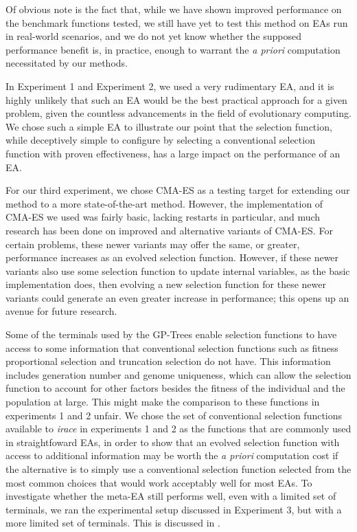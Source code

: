 \documentclass[sigconf]{acmart}
\begin{document}
Of obvious note is the fact that, while we have shown improved performance on the benchmark functions tested, we still have yet to test this method on EAs run in real-world scenarios, and we do not yet know whether the supposed performance benefit is, in practice, enough to warrant the \textit{a priori} computation necessitated by our methods.

In Experiment 1 and Experiment 2, we used a very rudimentary EA, and it is highly unlikely that such an EA would be the best practical approach for a given problem, given the countless advancements in the field of evolutionary computing. We chose such a simple EA to illustrate our point that the selection function, while deceptively simple to configure by selecting a conventional selection function with proven effectiveness, has a large impact on the performance of an EA.

For our third experiment, we chose CMA-ES as a testing target for extending our method to a more state-of-the-art method. However, the implementation of CMA-ES we used was fairly basic, lacking restarts in particular, and much research has been done on improved and alternative variants of CMA-ES. For certain problems, these newer variants may offer the same, or greater, performance increases as an evolved selection function. However, if these newer variants also use some selection function to update internal variables, as the basic implementation does, then evolving a new selection function for these newer variants could generate an even greater increase in performance; this opens up an avenue for future research.

Some of the terminals used by the GP-Trees enable selection functions to have access to some information that conventional selection functions such as fitness proportional selection and truncation selection do not have. This information includes generation number and genome uniqueness, which can allow the selection function to account for other factors besides the fitness of the individual and the population at large. This might make the comparison to these functions in experiments 1 and 2 unfair. We chose the set of conventional selection functions available to \textit{irace} in experiments 1 and 2 as the functions that are commonly used in straightfoward EAs, in order to show that an evolved selection function with access to additional information may be worth the \textit{a priori} computation cost if the alternative is to simply use a conventional selection function selected from the most common choices that would work acceptably well for most EAs. To investigate whether the meta-EA still performs well, even with a limited set of terminals, we ran the experimental setup discussed in Experiment 3, but with a more limited set of terminals. This is discussed in \citep{richter2019thesis}.
\end{document}
